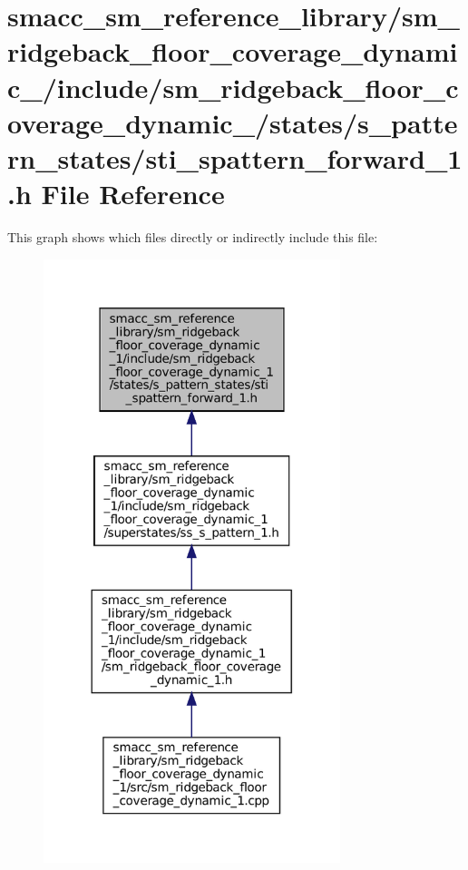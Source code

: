 \hypertarget{sm__ridgeback__floor__coverage__dynamic__1_2include_2sm__ridgeback__floor__coverage__dynamic__1_ec4a719465c8a232d790707661a510e5}{}\section{smacc\+\_\+sm\+\_\+reference\+\_\+library/sm\+\_\+ridgeback\+\_\+floor\+\_\+coverage\+\_\+dynamic\+\_/include/sm\+\_\+ridgeback\+\_\+floor\+\_\+coverage\+\_\+dynamic\+\_/states/s\+\_\+pattern\+\_\+states/sti\+\_\+spattern\+\_\+forward\+\_\+1.h File Reference}
\label{sm__ridgeback__floor__coverage__dynamic__1_2include_2sm__ridgeback__floor__coverage__dynamic__1_ec4a719465c8a232d790707661a510e5}
This graph shows which files directly or indirectly include this file\+:
\nopagebreak
\begin{figure}[H]
\begin{center}
\leavevmode
\includegraphics[width=245pt]{sm__ridgeback__floor__coverage__dynamic__1_2include_2sm__ridgeback__floor__coverage__dynamic__1_6ddd2357be81f87bef7a8bcdf9d2f4d0}
\end{center}
\end{figure}
